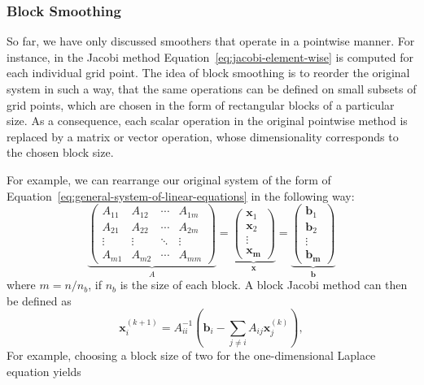 \subsubsection{Block Smoothing}
\label{subsec:block-smoothing}
So far, we have only discussed smoothers that operate in a pointwise manner.
For instance, in the Jacobi method Equation~\eqref{eq:jacobi-element-wise} is computed for each individual grid point.
The idea of block smoothing is to reorder the original system in such a way, that the same operations can be defined on small subsets of grid points, which are chosen in the form of rectangular blocks of a particular size.
As a consequence, each scalar operation in the original pointwise method is replaced by a matrix or vector operation, whose dimensionality corresponds to the chosen block size.

For example, we can rearrange our original system of the form of Equation~\eqref{eq:general-system-of-linear-equations} in the following way:
\begin{equation}
\underbrace{
\begin{pmatrix}A_{11}&A_{12}&\cdots &A_{1m}\\A_{21}&A_{22}&\cdots &A_{2m}\\\vdots &\vdots &\ddots &\vdots \\A_{m1}&A_{m2}&\cdots &A_{mm}\end{pmatrix}}_{A}
 = 
\underbrace{
\begin{pmatrix}
\bm{x}_1 \\ \bm{x}_2 \\ \vdots \\ \bm{x_m} 
\end{pmatrix}}_{\bm{x}} =
\underbrace{
\begin{pmatrix}
	\bm{b}_1 \\ \bm{b}_2 \\ \vdots \\ \bm{b_m} 
\end{pmatrix}}_{\bm{b}}
\end{equation}
where $m = n / n_b$, if $n_b$ is the size of each block.
A block Jacobi method can then be defined as
\begin{equation}
	\bm{x}_{i}^{(k+1)}=A_{ii}^{-1}\left(\bm{b}_{i}-\sum _{j\neq i}A_{ij}\bm{x}_{j}^{(k)}\right),
	\label{eq:jacobi-block-wise}
\end{equation}
For example, choosing a block size of two for the one-dimensional Laplace equation yields
